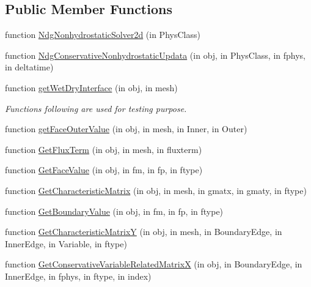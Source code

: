 \subsection*{Public Member Functions}
\begin{DoxyCompactItemize}
\item 
function \hyperlink{class_ndg_nonhydrostatic_solver2d_ab27493a25d5bbeb1fe764113fc403920}{Ndg\+Nonhydrostatic\+Solver2d} (in Phys\+Class)
\item 
function \hyperlink{class_ndg_nonhydrostatic_solver2d_a8e10c79f59a00a83ffbc80f035708b80}{Ndg\+Conservative\+Nonhydrostatic\+Updata} (in obj, in Phys\+Class, in fphys, in deltatime)
\item 
function \hyperlink{class_ndg_nonhydrostatic_solver2d_a0d78fbfbc3d2ce23d1131eecd035e209}{get\+Wet\+Dry\+Interface} (in obj, in mesh)
\begin{DoxyCompactList}\small\item\em Functions following are used for testing purpose. \end{DoxyCompactList}\item 
function \hyperlink{class_ndg_nonhydrostatic_solver2d_a66047e017a7c3cfebae7ce0c74e0c979}{get\+Face\+Outer\+Value} (in obj, in mesh, in Inner, in Outer)
\item 
function \hyperlink{class_ndg_nonhydrostatic_solver2d_af4928c7745923fa372844f97a981eb1b}{Get\+Flux\+Term} (in obj, in mesh, in fluxterm)
\item 
function \hyperlink{class_ndg_nonhydrostatic_solver2d_ac8f83a9a052b888eda9522e031032595}{Get\+Face\+Value} (in obj, in fm, in fp, in ftype)
\item 
function \hyperlink{class_ndg_nonhydrostatic_solver2d_a602ab72d7ecf3e4957f15f9793256107}{Get\+Characteristic\+Matrix} (in obj, in mesh, in gmatx, in gmaty, in ftype)
\item 
function \hyperlink{class_ndg_nonhydrostatic_solver2d_a363e71897524e39259814c890745c583}{Get\+Boundary\+Value} (in obj, in fm, in fp, in ftype)
\item 
function \hyperlink{class_ndg_nonhydrostatic_solver2d_aaad986805036d8318f1d44a4bbaf3ebb}{Get\+Characteristic\+MatrixY} (in obj, in mesh, in Boundary\+Edge, in Inner\+Edge, in Variable, in ftype)
\item 
function \hyperlink{class_ndg_nonhydrostatic_solver2d_a4b69392454b65e88eaeec25eee161697}{Get\+Conservative\+Variable\+Related\+MatrixX} (in obj, in Boundary\+Edge, in Inner\+Edge, in fphys, in ftype, in index)
\item 

\end{DoxyCompactItemize}
